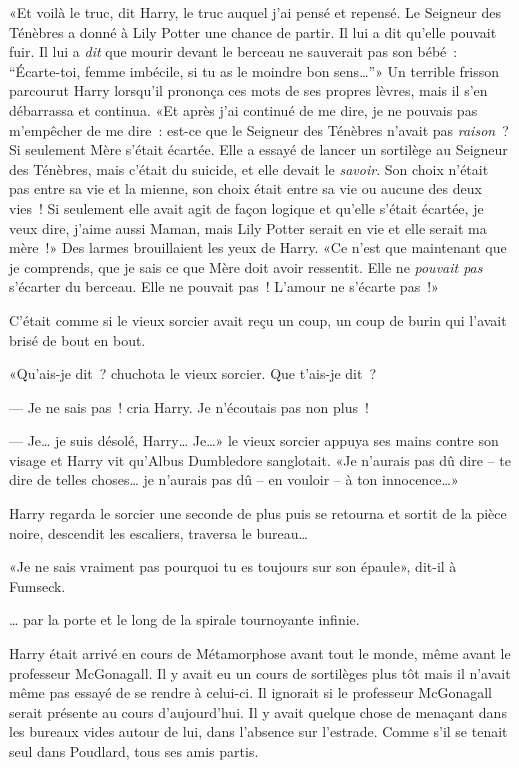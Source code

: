 «Et voilà le truc, dit Harry, le truc auquel j'ai pensé et repensé. Le Seigneur des Ténèbres a donné à Lily Potter une chance de partir. Il lui a dit qu'elle pouvait fuir. Il lui a \emph{dit} que mourir devant le berceau ne sauverait pas son bébé~: “Écarte-toi, femme imbécile, si tu as le moindre bon sens…”» Un terrible frisson parcourut Harry lorsqu'il prononça ces mots de ses propres lèvres, mais il s'en débarrassa et continua. «Et après j'ai continué de me dire, je ne pouvais pas m'empêcher de me dire~: est-ce que le Seigneur des Ténèbres n'avait pas \emph{raison}~? Si seulement Mère s'était écartée. Elle a essayé de lancer un sortilège au Seigneur des Ténèbres, mais c'était du suicide, et elle devait le \emph{savoir}. Son choix n'était pas entre sa vie et la mienne, son choix était entre sa vie ou aucune des deux vies~! Si seulement elle avait agit de façon logique et qu'elle s'était écartée, je veux dire, j'aime aussi Maman, mais Lily Potter serait en vie et elle serait ma mère~!» Des larmes brouillaient les yeux de Harry. «Ce n'est que maintenant que je comprends, que je sais ce que Mère doit avoir ressentit. Elle ne \emph{pouvait pas} s'écarter du berceau. Elle ne pouvait pas~! L'amour ne s'écarte pas~!»

C'était comme si le vieux sorcier avait reçu un coup, un coup de burin qui l'avait brisé de bout en bout.

«Qu'ais-je dit~? chuchota le vieux sorcier. Que t'ais-je dit~?

--- Je ne sais pas~! cria Harry. Je n'écoutais pas non plus~!

--- Je… je suis désolé, Harry… Je…» le vieux sorcier appuya ses mains contre son visage et Harry vit qu'Albus Dumbledore sanglotait. «Je n'aurais pas dû dire -- te dire de telles choses… je n'aurais pas dû -- en vouloir -- à ton innocence…»

Harry regarda le sorcier une seconde de plus puis se retourna et sortit de la pièce noire, descendit les escaliers, traversa le bureau…

«Je ne sais vraiment pas pourquoi tu es toujours sur son épaule», dit-il à Fumseck.

… par la porte et le long de la spirale tournoyante infinie.

\later

Harry était arrivé en cours de Métamorphose avant tout le monde, même avant le professeur McGonagall. Il y avait eu un cours de sortilèges plus tôt mais il n'avait même pas essayé de se rendre à celui-ci. Il ignorait si le professeur McGonagall serait présente au cours d'aujourd'hui. Il y avait quelque chose de menaçant dans les bureaux vides autour de lui, dans l'absence sur l'estrade. Comme s'il se tenait seul dans Poudlard, tous ses amis partis.


